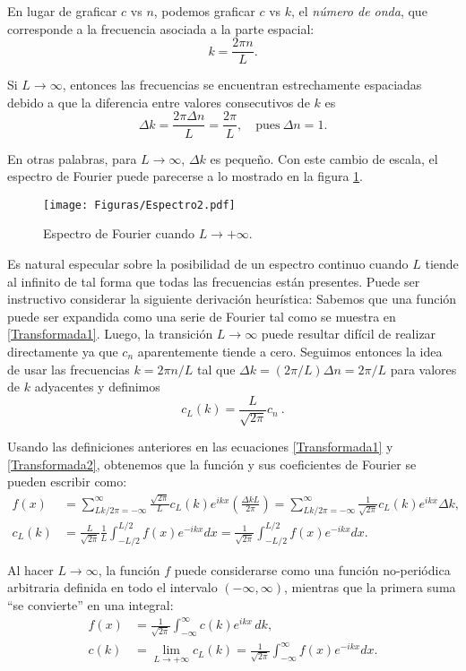 En lugar de graficar $c$ vs $n$, podemos graficar $c$ vs $k$, el \emph{número de onda}, que corresponde a la frecuencia asociada a la parte espacial:
$$k = \frac{2\pi n}{L}.$$

Si $L \to \infty$, entonces las frecuencias se encuentran estrechamente espaciadas debido a que la diferencia entre valores consecutivos de $k$ es
$$\Delta k = \frac{ 2\pi \Delta n}{L}  = \frac{2\pi}{L}, \quad \mbox{pues}~ \Delta n = 1.$$

En otras palabras, para $L \to \infty$, $\Delta k$ es pequeño. Con este cambio de escala, el espectro de Fourier puede parecerse a lo mostrado en la figura \ref{Espectro1}.

\begin{figure}
    \centering
    \texttt{[image: Figuras/Espectro2.pdf]}
    \caption{Espectro de Fourier cuando $L \to + \infty$.}
    \label{Espectro1}
\end{figure}

Es natural especular sobre la posibilidad de un espectro continuo cuando $L$ tiende al infinito  de tal forma que todas las frecuencias están presentes. Puede ser instructivo considerar la siguiente derivación heurística: Sabemos que una función puede ser expandida como una serie de Fourier tal como se muestra en \eqref{Transformada1}. Luego, la transición $L \to \infty$ puede resultar difícil de realizar directamente ya que $c_n$ aparentemente tiende a cero. Seguimos entonces la idea de usar las frecuencias $k = 2\pi n/L$ tal que
$\Delta k = (2\pi/L ) \Delta n = 2\pi/L$ para valores de $k$ adyacentes y definimos
\begin{equation}
    c_L(k) = \frac{L}{\sqrt{2 \pi}} c_n \ .
\end{equation}

Usando las definiciones anteriores en las ecuaciones \eqref{Transformada1} y \eqref{Transformada2}, obtenemos que la función y sus coeficientes de Fourier se pueden escribir como: 
\begin{align*}
    f(x)&= \sum_{Lk/2\pi = -\infty}^{\infty} \frac{\sqrt{2\pi}}{L} c_L(k) e^{ikx} \left( \frac{\Delta k L}{2\pi}\right) = \sum_{Lk/2\pi = -\infty}^{\infty}  \frac{1}{\sqrt{2\pi}} c_L(k) e^{ikx} \Delta k , \\
  c_L(k) &= \frac{L}{\sqrt{2\pi}} \frac{1}{L} \int_{-L/2}^{L/2} f(x) e^{-ikx} dx = \frac{1}{\sqrt{2\pi}} \int_{-L/2}^{L/2} f(x) e^{-ikx} dx.
\end{align*}

Al hacer $L \to \infty$, la función $f$ puede considerarse como una función no-periódica arbitraria definida en todo el intervalo $(-\infty, \infty)$, mientras que la primera suma ``se convierte'' en una integral:
\begin{align*}
    f(x)& = \frac{1}{\sqrt{2\pi}} \int_{-\infty}^{\infty} c(k) e^{ikx} \,dk, \\
  c(k) & = \lim_{L\to + \infty} c_L(k) = \frac{1}{\sqrt{2\pi}} \int_{-\infty}^{\infty} f(x) e^{-ikx} dx.
\end{align*}

